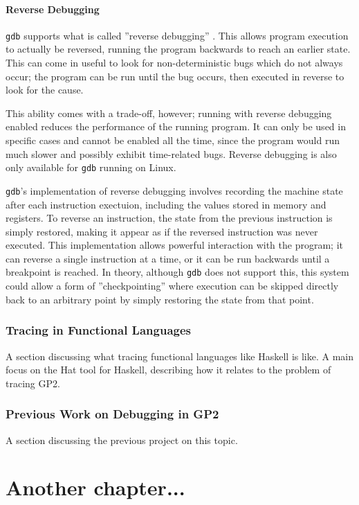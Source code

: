 \documentclass[authoryearcitations]{UoYCSproject}
\begin{document}
\subsubsection{Reverse Debugging}

\texttt{gdb} supports what is called ''reverse debugging'' \citep{gdbreversesite}.
This allows program execution to actually be reversed, running the program
backwards to reach an earlier state. This can come in useful to look for
non-deterministic bugs which do not always occur; the program can be run until
the bug occurs, then executed in reverse to look for the cause.

This ability comes with a trade-off, however; running with reverse debugging
enabled reduces the performance of the running program. It can only be used in
specific cases and cannot be enabled all the time, since the program would run
much slower and possibly exhibit time-related bugs. Reverse debugging is also
only available for \texttt{gdb} running on Linux.

\texttt{gdb}'s implementation of reverse debugging involves recording the machine
state after each instruction exectuion, including the values stored in memory and
registers. To reverse an instruction, the state from the previous instruction is
simply restored, making it appear as if the reversed instruction was never
executed. This implementation allows powerful interaction with the program; it
can reverse a single instruction at a time, or it can be run backwards until a
breakpoint is reached. In theory, although \texttt{gdb} does not support this,
this system could allow a form of ''checkpointing'' where execution can be skipped
directly back to an arbitrary point by simply restoring the state from that point.



\subsection{Tracing in Functional Languages}
\label{sec:TracingInFunctionalLanguages}

A section discussing what tracing functional languages like Haskell is like. A
main focus on the Hat tool for Haskell, describing how it relates to the
problem of tracing GP2.


\subsection{Previous Work on Debugging in GP2}
\label{sec:PreviousWorkOnDebuggingInGP2}

A section discussing the previous project \citep{taylor2016} on this topic.



\clearpage

\chapter{Another chapter...}



\clearpage


\end{document}
